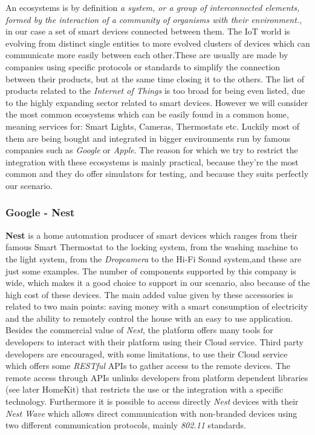 An ecosystems is by definition \textit{a system, or a group of interconnected elements,
formed by the interaction of a community of organisms with their environment.},
in our case a set of smart devices connected between them. The IoT world is evolving
from distinct single entities to more evolved clusters of devices which can communicate
more easily between each other.These are usually are made by companies using specific protocols or standards
to simplify the connection between their products, but at the same time closing it to the others.
The list of products related to the \textit{Internet of Things} is too broad for
being even listed, due to the highly expanding sector related to smart devices.
However we will consider the most common ecosystems which can be easily found in a common
home, meaning services for: Smart Lights, Cameras, Thermostats etc. Luckily
most of them are being bought and integrated in bigger environments run by
famous companies such as \textit{Google} or \textit{Apple}.
The reason for which we try to restrict the integration with these ecosystems is
mainly practical, because they're the most common and they do offer simulators
for testing, and because they suits perfectly our scenario.

\subsubsection{Google - Nest}

\textbf{Nest}\cite{nest} is a home automation producer of smart devices
which ranges from their famous Smart Thermostat to the locking system, from the
washing machine to the light system, from the \textit{Dropcamera} to the Hi-Fi Sound system,and
these are just some examples. The number of components supported by this company
is wide, which makes it a good choice to support in our scenario, also because of
the high cost of these devices. The main added value given by these accessories is related
to two main points: saving money with a smart consumption of electricity and the ability
to remotely control the house with an easy to use application.
Besides the commercial value of \textit{Nest}, the platform offers many tools for developers
to interact with their platform using their Cloud service. Third party developers
are encouraged, with some limitations, to use their Cloud service which
offers some \textit{RESTful} APIs to gather access to the remote devices.
The remote access through APIs unlinks developers from platform dependent libraries (see later HomeKit)
that restricts the use or the integration with a specific technology.
Furthermore it is possible to access directly \textit{Nest} devices with their \textit{Nest Wave}
which allows direct communication with non-branded devices using two different communication protocols,
mainly \textit{802.11} standards.


